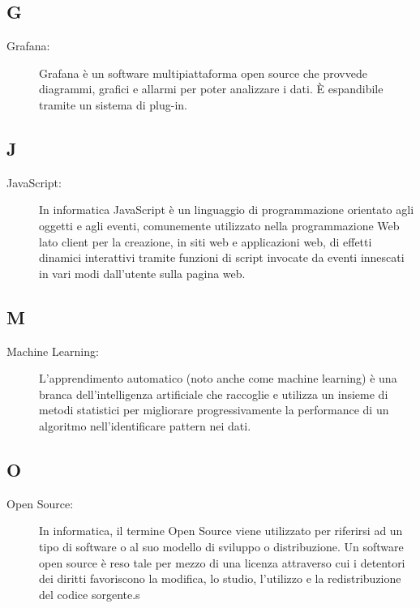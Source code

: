 \documentclass[../manuale-sviluppatore.tex]{subfiles}
\begin{document}
\subsection*{G}
\begin{description}
  \item[Grafana:] Grafana è un software multipiattaforma open source che provvede diagrammi, grafici e allarmi per poter analizzare i dati. È espandibile tramite un sistema di plug-in.
\end{description}

\subsection*{J}
\begin{description}
  \item[JavaScript:] In informatica JavaScript è un linguaggio di programmazione orientato agli oggetti e agli eventi, comunemente utilizzato nella programmazione Web lato client per la creazione, in siti web e applicazioni web, di effetti dinamici interattivi tramite funzioni di script invocate da eventi innescati in vari modi dall'utente sulla pagina web.
\end{description}

\subsection*{M}
\begin{description}
  \item[Machine Learning:] L’apprendimento automatico (noto anche come machine learning) è una branca dell'intelligenza artificiale che raccoglie e utilizza un insieme di metodi statistici per migliorare progressivamente la performance di un algoritmo nell'identificare pattern nei dati.
\end{description}

\subsection*{O}
\begin{description}
  \item[Open Source:] In informatica, il termine Open Source viene utilizzato per riferirsi ad un tipo di software o al suo modello di sviluppo o distribuzione. Un software open source è reso tale per mezzo di una licenza attraverso cui i detentori dei diritti favoriscono la modifica, lo studio, l'utilizzo e la redistribuzione del codice sorgente.s
\end{description}
\end{document}
